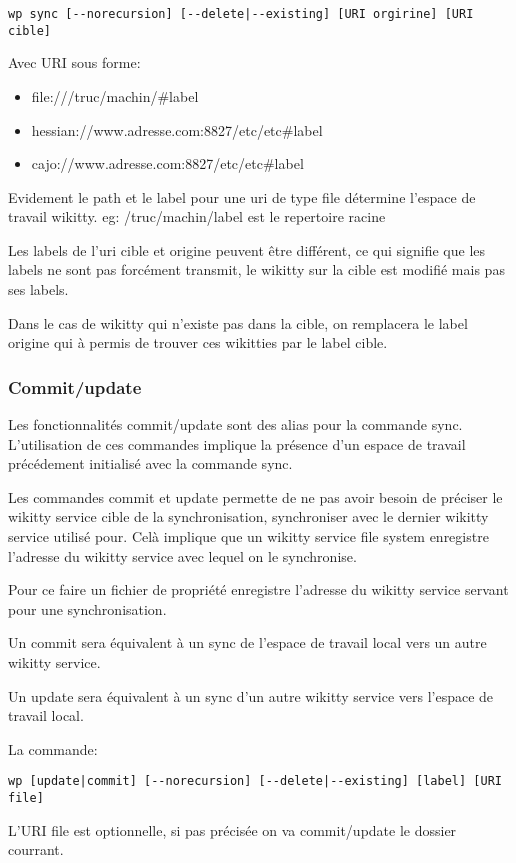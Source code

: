 \verb!wp sync [--norecursion] [--delete|--existing] [URI orgirine] [URI cible]!

Avec URI sous forme: 
\begin{itemize}
\item file:///truc/machin/\#label
\item hessian://www.adresse.com:8827/etc/etc\#label
\item cajo://www.adresse.com:8827/etc/etc\#label
\end{itemize}

Evidement le path et le label pour une uri de type file détermine l'espace de
travail wikitty. eg: /truc/machin/label est le repertoire racine

Les labels de l'uri cible et origine peuvent être différent, ce qui signifie que
les labels ne sont pas forcément transmit, le wikitty sur la cible est modifié
mais pas ses labels.

Dans le cas de wikitty qui n'existe pas dans la cible, on remplacera le label
origine qui à permis de trouver ces wikitties par le label cible.

\subsubsection{Commit/update}

Les fonctionnalités commit/update sont des alias pour la commande sync.
L'utilisation de ces commandes implique la présence d'un espace de travail
précédement initialisé avec la commande sync.

Les commandes commit et update permette de ne pas avoir besoin de préciser le
wikitty service cible de la synchronisation, synchroniser avec le dernier
wikitty service utilisé pour. Celà implique que un wikitty service file system
enregistre l'adresse du wikitty service avec lequel on le synchronise.

Pour ce faire un fichier de propriété enregistre l'adresse du wikitty service
servant pour une synchronisation.

Un commit sera équivalent à un sync de l'espace de travail local vers un autre
wikitty service. 

Un update sera équivalent à un sync d'un autre wikitty service vers l'espace de
travail local.

La commande:

\verb!wp [update|commit] [--norecursion] [--delete|--existing] [label] [URI file]!

L'URI file est optionnelle, si pas précisée on va commit/update le dossier 
courrant.


